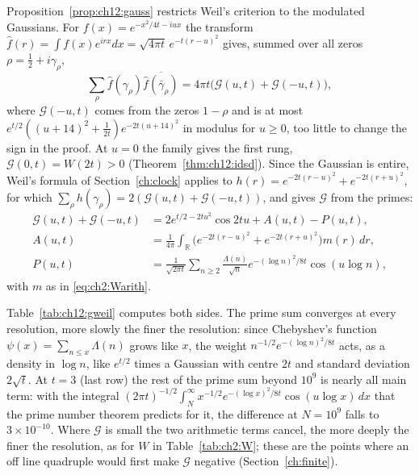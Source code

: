 Proposition~\ref{prop:ch12:gauss} restricts Weil's criterion to the modulated Gaussians. For $f(x)=e^{-x^2/4t-iux}$ the transform $\hat f(r)=\int f(x)e^{irx}dx=\sqrt{4\pi t}\,e^{-t(r-u)^2}$ gives, summed over all zeros $\rho=\frac12+i\gamma_\rho$,
\[
\sum_\rho\hat f(\gamma_\rho)\overline{\hat f(\bar\gamma_\rho)}=4\pi t\big(\mathcal G(u,t)+\mathcal G(-u,t)\big),
\]
where $\mathcal G(-u,t)$ comes from the zeros $1-\rho$ and is at most $e^{t/2}((u+14)^2+\frac1{2t})e^{-2t(u+14)^2}$ in modulus for $u\ge0$, too little to change the sign in the proof. At $u=0$ the family gives the first rung, $\mathcal G(0,t)=W(2t)>0$ (Theorem~\ref{thm:ch12:idsd}). Since the Gaussian is entire, Weil's formula of Section~\ref{ch:clock} applies to $h(r)=e^{-2t(r-u)^2}+e^{-2t(r+u)^2}$, for which $\sum_\rho h(\gamma_\rho)=2(\mathcal G(u,t)+\mathcal G(-u,t))$, and gives $\mathcal G$ from the primes:
\begin{equation}\label{eq:ch12:Garith}
\begin{aligned}
\mathcal G(u,t)+\mathcal G(-u,t)&=2e^{t/2-2tu^2}\cos2tu+A(u,t)-P(u,t),\\
A(u,t)&=\frac1{4\pi}\int_{\mathbb R}\big(e^{-2t(r-u)^2}+e^{-2t(r+u)^2}\big)m(r)\,dr,\\
P(u,t)&=\frac1{\sqrt{2\pi t}}\sum_{n\ge2}\frac{\Lambda(n)}{\sqrt n}e^{-(\log n)^2/8t}\cos(u\log n),
\end{aligned}
\end{equation}
with $m$ as in \eqref{eq:ch2:Warith}.

Table~\ref{tab:ch12:gweil} computes both sides. The prime sum converges at every resolution, more slowly the finer the resolution: since Chebyshev's function $\psi(x)=\sum_{n\le x}\Lambda(n)$ grows like $x$, the weight $n^{-1/2}e^{-(\log n)^2/8t}$ acts, as a density in $\log n$, like $e^{t/2}$ times a Gaussian with centre $2t$ and standard deviation $2\sqrt t$. At $t=3$ (last row) the rest of the prime sum beyond $10^9$ is nearly all main term: with the integral $(2\pi t)^{-1/2}\int_N^\infty x^{-1/2}e^{-(\log x)^2/8t}\cos(u\log x)\,dx$ that the prime number theorem predicts for it, the difference at $N=10^9$ falls to $3\times10^{-10}$. Where $\mathcal G$ is small the two arithmetic terms cancel, the more deeply the finer the resolution, as for $W$ in Table~\ref{tab:ch2:W}; these are the points where an off line quadruple would first make $\mathcal G$ negative (Section~\ref{ch:finite}).


